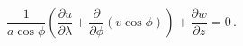 \begin{equation}
    \frac{1}{a\cos\phi}\left(\frac{\partial u}{\partial\lambda} + \frac{\partial}{\partial\phi}\left(v\cos\phi\right)\right) + \frac{\partial w}{\partial z}=0 \,.
\label{EQN:Continuity}
\end{equation}
